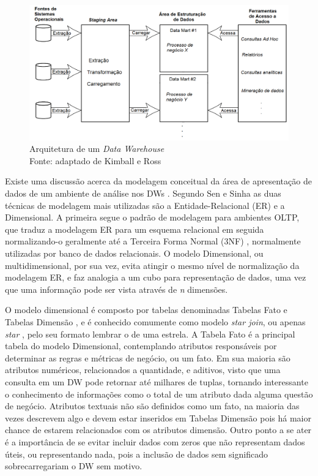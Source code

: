 \begin{figure}[htpb]
	\centering
		\includegraphics[width=\textwidth]{img/dw_arc}
    \caption[Arquitetura de um \textit{Data Warehouse}]
        {Arquitetura de um \textit{Data Warehouse} \\ Fonte: adaptado de Kimball e Ross \cite{kimball2002dw}}
	\label{fig:dw_arq}
\end{figure}

Existe uma discussão acerca da modelagem conceitual da área de apresentação de dados de um ambiente de análise nos DWs \cite{sen2005comparison}. Segundo Sen e Sinha \cite{sen2005comparison} as duas técnicas de modelagem mais utilizadas são a Entidade-Relacional (ER) e a Dimensional. A primeira segue o padrão de modelagem para ambientes OLTP, que traduz a modelagem ER para um esquema relacional em seguida normalizando-o geralmente até a Terceira Forma Normal (3NF) \cite{kimball2002dw}, normalmente utilizadas por banco de dados relacionais. O modelo Dimensional, ou multidimensional, por sua vez, evita atingir o mesmo nível de normalização da modelagem ER, e faz analogia a um cubo para representação de dados, uma vez que uma informação pode ser vista através de \textit{n} dimensões. 

O modelo dimensional é composto por tabelas denominadas Tabelas Fato e Tabelas Dimensão \cite{kimball2002dw}, e é conhecido comumente como modelo \textit{star join}, ou apenas \textit{star} \cite{sen2005comparison}, pelo seu formato lembrar o de uma estrela. A Tabela Fato é a principal tabela do modelo Dimensional, contemplando atributos responsáveis por determinar as regras e métricas de negócio, ou um fato. Em sua maioria são atributos numéricos, relacionados a quantidade, e aditivos, visto que uma consulta em um DW pode retornar até milhares de tuplas, tornando interessante o conhecimento de informações como o total de um atributo dada alguma questão de negócio. Atributos textuais não são definidos como um fato, na maioria das vezes descrevem algo e devem estar inseridos em Tabelas Dimensão pois há maior chance de estarem relacionados com os atributos dimensão. Outro ponto a se ater é a importância de se evitar incluir dados com zeros que não representam dados úteis, ou representando nada, pois a inclusão de dados sem significado sobrecarregariam o DW sem motivo.

